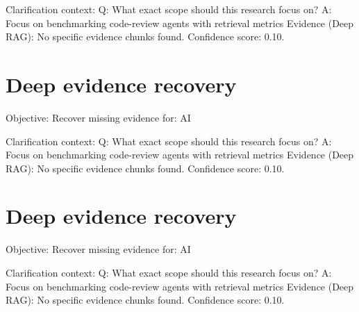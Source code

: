 \documentclass[conference]{IEEEtran}
\begin{document}
Clarification context:
Q: What exact scope should this research focus on?
A: Focus on benchmarking code-review agents with retrieval metrics
Evidence (Deep RAG):
No specific evidence chunks found.
Confidence score: 0.10.

\section{Deep evidence recovery}
Objective: Recover missing evidence for: AI

Clarification context:
Q: What exact scope should this research focus on?
A: Focus on benchmarking code-review agents with retrieval metrics
Evidence (Deep RAG):
No specific evidence chunks found.
Confidence score: 0.10.

\section{Deep evidence recovery}
Objective: Recover missing evidence for: AI

Clarification context:
Q: What exact scope should this research focus on?
A: Focus on benchmarking code-review agents with retrieval metrics
Evidence (Deep RAG):
No specific evidence chunks found.
Confidence score: 0.10.

\
\

\
\end{document}
